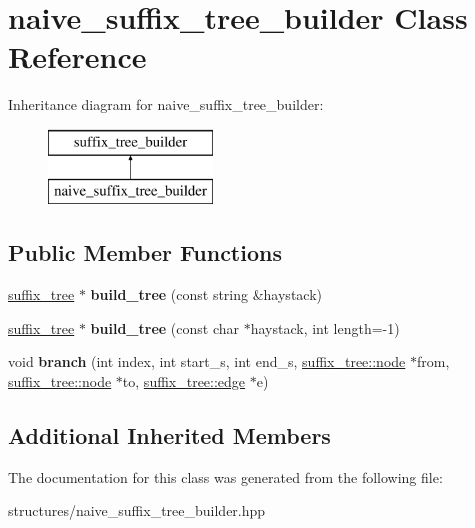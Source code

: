 \hypertarget{classnaive__suffix__tree__builder}{\section{naive\+\_\+suffix\+\_\+tree\+\_\+builder Class Reference}
\label{classnaive__suffix__tree__builder}
}
Inheritance diagram for naive\+\_\+suffix\+\_\+tree\+\_\+builder\+:\begin{figure}[H]
\begin{center}
\leavevmode
\includegraphics[height=2.000000cm]{classnaive__suffix__tree__builder}
\end{center}
\end{figure}
\subsection*{Public Member Functions}
\begin{DoxyCompactItemize}
\item 
\hypertarget{classnaive__suffix__tree__builder_a4f6133321fe57fc7fe25b08df26f43fd}{\hyperlink{classsuffix__tree}{suffix\+\_\+tree} $\ast$ {\bfseries build\+\_\+tree} (const string \&haystack)}\label{classnaive__suffix__tree__builder_a4f6133321fe57fc7fe25b08df26f43fd}

\item 
\hypertarget{classnaive__suffix__tree__builder_ab7accd6a62ec6e9469e3e8080d270b2f}{\hyperlink{classsuffix__tree}{suffix\+\_\+tree} $\ast$ {\bfseries build\+\_\+tree} (const char $\ast$haystack, int length=-\/1)}\label{classnaive__suffix__tree__builder_ab7accd6a62ec6e9469e3e8080d270b2f}

\item 
\hypertarget{classnaive__suffix__tree__builder_a0d87a4f6d8c106f0db372fd7cc7c9a16}{void {\bfseries branch} (int index, int start\+\_\+s, int end\+\_\+s, \hyperlink{classsuffix__tree_1_1node}{suffix\+\_\+tree\+::node} $\ast$from, \hyperlink{classsuffix__tree_1_1node}{suffix\+\_\+tree\+::node} $\ast$to, \hyperlink{classsuffix__tree_1_1edge}{suffix\+\_\+tree\+::edge} $\ast$e)}\label{classnaive__suffix__tree__builder_a0d87a4f6d8c106f0db372fd7cc7c9a16}

\end{DoxyCompactItemize}
\subsection*{Additional Inherited Members}


The documentation for this class was generated from the following file\+:\begin{DoxyCompactItemize}
\item 
structures/naive\+\_\+suffix\+\_\+tree\+\_\+builder.\+hpp\end{DoxyCompactItemize}
